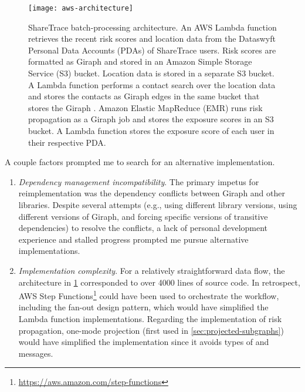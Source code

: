 \begin{figure}[htbp]
\centering
\texttt{[image: aws-architecture]}
\caption[ShareTrace batch-processing architecture]{ShareTrace batch-processing architecture.  An AWS Lambda function\protect\footnotemark{} retrieves the recent risk scores and location data from the Dataswyft Personal Data Accounts (PDAs) of ShareTrace users. Risk scores are formatted as Giraph \verticesName and stored in an Amazon Simple Storage Service\protect\footnotemark{} (S3) bucket. Location data is stored in a separate S3 bucket.  A Lambda function performs a contact search over the location data and stores the contacts as Giraph edges in the same bucket that stores the Giraph \verticesName.  Amazon Elastic MapReduce\protect\footnotemark{} (EMR) runs risk propagation as a Giraph job and stores the exposure scores in an S3 bucket.  A Lambda function stores the exposure score of each user in their respective PDA.}
\label{fig:aws-architecture}
\end{figure}

\addtocounter{footnote}{-1}
\addtocounter{footnote}{-1}
\addtocounter{footnote}{1}
\addtocounter{footnote}{1}

\clearpage

A couple factors prompted me to search for an alternative implementation.
  \begin{enumerate}
    \item \emph{Dependency management incompatibility}. The primary impetus for reimplementation was the dependency conflicts between Giraph and other libraries. Despite several attempts (e.g., using different library versions, using different versions of Giraph, and forcing specific versions of transitive dependencies) to resolve the conflicts, a lack of personal development experience and stalled progress prompted me pursue alternative implementations.
    \item \emph{Implementation complexity}. For a relatively straightforward data flow, the architecture in \cref{fig:aws-architecture} corresponded to over \num{4000} lines of source code. In retrospect, AWS Step Functions\footnote{\url{https://aws.amazon.com/step-functions}} could have been used to orchestrate the workflow, including the fan-out design pattern, which would have simplified the Lambda function implementations. Regarding the implementation of risk propagation, one-mode projection (first used in \cref{sec:projected-subgraphs}) would have simplified the implementation since it avoids types of \verticesName and messages.
  \end{enumerate}

